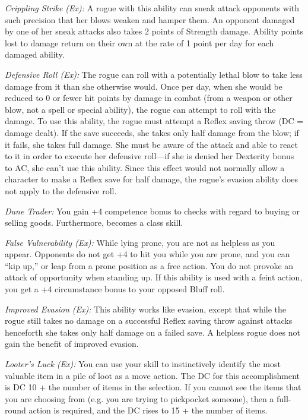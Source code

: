 \textit{Crippling Strike (Ex):} A rogue with this ability can sneak attack opponents with such precision that her blows weaken and hamper them. An opponent damaged by one of her sneak attacks also takes 2 points of Strength damage. Ability points lost to damage return on their own at the rate of 1 point per day for each damaged ability.

\textit{Defensive Roll (Ex):} The rogue can roll with a potentially lethal blow to take less damage from it than she otherwise would. Once per day, when she would be reduced to 0 or fewer hit points by damage in combat (from a weapon or other blow, not a spell or special ability), the rogue can attempt to roll with the damage. To use this ability, the rogue must attempt a Reflex saving throw (DC = damage dealt). If the save succeeds, she takes only half damage from the blow; if it fails, she takes full damage. She must be aware of the attack and able to react to it in order to execute her defensive roll---if she is denied her Dexterity bonus to AC, she can't use this ability. Since this effect would not normally allow a character to make a Reflex save for half damage, the rogue's evasion ability does not apply to the defensive roll.

\textit{Dune Trader:} You gain +4 competence bonus to  checks with regard to buying or selling goods. Furthermore,  becomes a class skill.

\textit{False Vulnerability (Ex):} While lying prone, you are not as helpless as you appear. Opponents do not get +4 to hit you while you are prone, and you can ``kip up,'' or leap from a prone position as a free action. You do not provoke an attack of opportunity when standing up. If this ability is used with a feint action, you get a +4 circumstance bonus to your opposed Bluff roll.

\textit{Improved Evasion (Ex):} This ability works like evasion, except that while the rogue still takes no damage on a successful Reflex saving throw against attacks henceforth she takes only half damage on a failed save. A helpless rogue does not gain the benefit of improved evasion.

\textit{Looter's Luck (Ex):} You can use your  skill to instinctively identify the most valuable item in a pile of loot as a move action. The DC for this accomplishment is DC 10 + the number of items in the selection. If you cannot see the items that you are choosing from (e.g. you are trying to pickpocket someone), then a full-round action is required, and the DC rises to 15 + the number of items.

